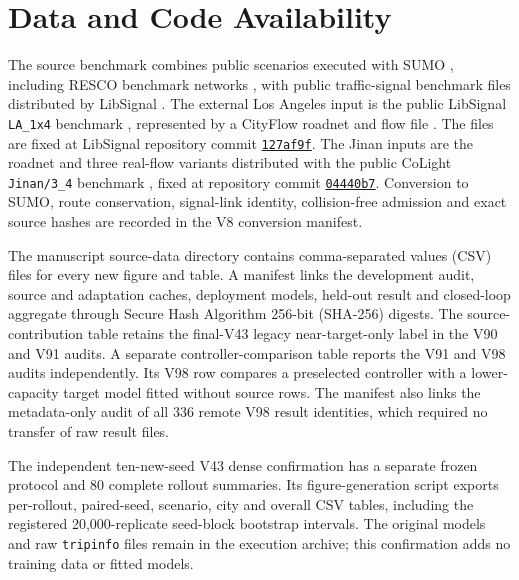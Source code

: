 \section{Data and Code Availability}

The source benchmark combines public scenarios executed with SUMO
\citep{lopez2018microscopic}, including RESCO benchmark networks
\citep{ault2021reinforcement}, with public traffic-signal benchmark files
distributed by LibSignal \citep{mei2022libsignal}.  The external Los Angeles
input is the public LibSignal \texttt{LA\_1x4} benchmark
\citep{mei2022libsignal}, represented by a CityFlow roadnet and flow file
\citep{zhang2019cityflow}.  The files are fixed at LibSignal repository commit
\href{https://github.com/DaRL-LibSignal/LibSignal/commit/127af9f93902778e556de2eedb2b606c4c9447e6}{\texttt{127af9f}}.
The Jinan inputs are the roadnet and three real-flow variants distributed with
the public CoLight \texttt{Jinan/3\_4} benchmark \citep{wei2019colight}, fixed
at repository commit
\href{https://github.com/wingsweihua/colight/commit/04440b722e7f36d7043a3f2ad8e40c3df301fad3}{\texttt{04440b7}}.
Conversion to SUMO, route conservation, signal-link identity, collision-free
admission and exact source hashes are recorded in the V8 conversion manifest.

The manuscript source-data directory contains comma-separated values (CSV)
files for every new figure and table.  A manifest links the development audit,
source and adaptation caches, deployment models, held-out result and
closed-loop aggregate through Secure Hash Algorithm 256-bit (SHA-256) digests.
The source-contribution table retains the final-V43 legacy near-target-only
label in the V90 and V91 audits.  A separate controller-comparison table reports
the V91 and V98 audits independently.  Its V98 row compares a preselected
controller with a lower-capacity target model fitted without source rows.
The manifest also links the metadata-only audit of all 336 remote V98 result
identities, which required no transfer of raw result files.

The independent ten-new-seed V43 dense confirmation has a separate frozen
protocol and 80 complete rollout summaries.  Its figure-generation script
exports per-rollout, paired-seed, scenario, city and overall CSV tables,
including the registered 20,000-replicate seed-block bootstrap intervals.
The original models and raw \texttt{tripinfo} files remain in the execution
archive; this confirmation adds no training data or fitted models.

